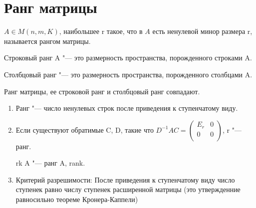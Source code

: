 ﻿\section{Ранг матрицы}
\begin{Def}
$A \in M(n, m, K)$, наибольшее r такое, что в $A$ есть ненулевой минор размера r, называется рангом матрицы. 
\end{Def}

\begin{Def}
Строковый ранг A "--- это размерность пространства, 
порожденного строками A.
\end{Def}

\begin{Def}
Столбцовый ранг "--- это размерность пространства, порожденного столбцами A.
\end{Def}

\begin{theorem}{}
Ранг матрицы, ее строковой ранг и столбцовый ранг совпадают.
\end{theorem}

\begin{Rem}
\begin{enumerate}
\item Ранг "--- число ненулевых строк после приведения к ступенчатому виду. 
\item Если существуют обратимые C, D, такие что $D^{-1}AC = 
\begin{pmatrix}
E_r&0\\
0&0\\
\end{pmatrix}$, r "--- ранг.

rk A "--- ранг A, rank.
\item Критерий разрешимости:
После приведения к ступенчатому виду число ступенек равно числу ступенек расширенной матрицы
(это утвержденние равносильно теореме Кронера-Каппели)
\end{enumerate}
\end{Rem}

